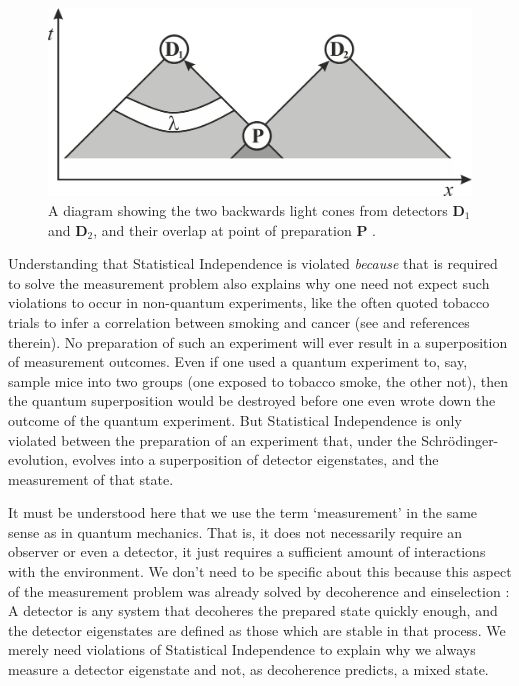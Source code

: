 \documentclass[superscriptaddress,floatfix,nofootinbib,12pt]{revtex4-2}
\begin{document}
\begin{figure}
    \centering
    \includegraphics[width=\linewidth]{bellsi.png}
    \caption{A diagram showing the two backwards light cones from detectors {\bf D}$_1$ and {\bf D}$_2$, and their overlap at point of preparation \textbf{P
    }.}
    \label{fig:locality}
\end{figure}

Understanding that Statistical Independence is violated \emph{because} that is required to solve the measurement problem also explains why one need not expect such violations to occur in non-quantum experiments, like the often quoted tobacco trials to infer a correlation between smoking and cancer (see \cite{Hossenfelder2020Rethinking} and references therein). No preparation of such an experiment will ever result in a superposition of measurement outcomes. Even if one used a quantum experiment to, say, sample mice into two groups (one exposed to tobacco smoke, the other not), then the quantum superposition would be destroyed before one even wrote down the outcome of the quantum experiment. But Statistical Independence is only violated between the preparation of an experiment that, under the Schr\"odinger-evolution, evolves into a superposition of detector eigenstates, and the measurement of that state. 

It must be understood here that we use the term `measurement' in the same sense as in quantum mechanics. That is, it does not necessarily require an observer or even a detector, it just requires a sufficient amount of interactions with the environment. We don't need to be specific about this because this aspect of the measurement problem was already solved by decoherence and einselection \cite{Zurek2003Decoherence}: A detector is any system that decoheres the prepared state quickly enough, and the detector eigenstates are defined as those which are stable in that process. We merely need violations of Statistical Independence to explain why we always measure a detector eigenstate and not, as decoherence predicts, a mixed state. 
\end{document}
